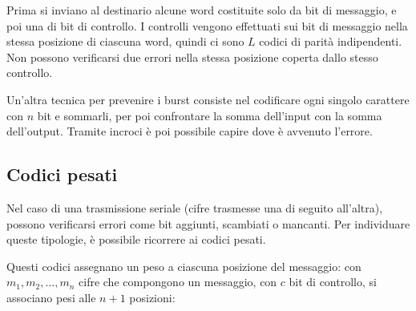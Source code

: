 Prima si inviano al destinario alcune word costituite solo da bit di messaggio, e poi una di bit di controllo. I controlli vengono effettuati sui bit di messaggio nella stessa posizione di ciascuna word, quindi ci sono $L$ codici di parità indipendenti. Non possono verificarsi due errori nella stessa posizione coperta dallo stesso controllo.

Un'altra tecnica per prevenire i burst consiste nel codificare ogni singolo carattere con $n$ bit e sommarli, per poi confrontare la somma dell'input con la somma dell'output. Tramite incroci è poi possibile capire dove è avvenuto l'errore.

\subsection{Codici pesati}
Nel caso di una trasmissione seriale (cifre trasmesse una di seguito all'altra), possono verificarsi errori come bit aggiunti, scambiati o mancanti. Per individuare queste tipologie, è possibile ricorrere ai codici pesati.

Questi codici assegnano un peso a ciascuna posizione del messaggio: con $m_1, m_2, \dots, m_n$ cifre che compongono un messaggio, con $c$ bit di controllo, si associano pesi alle $n + 1$ posizioni: 







